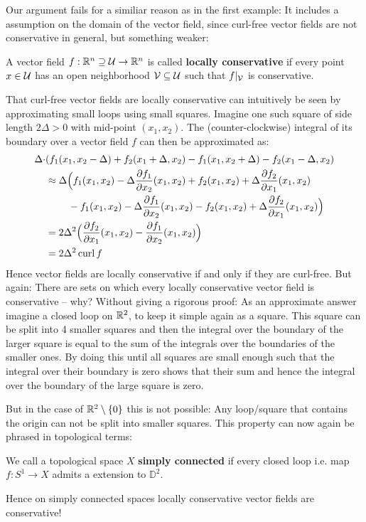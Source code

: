 Our argument fails for a similiar reason as in the first example: It includes a assumption on the domain of
the vector field, since curl-free vector fields are not conservative in general, but something weaker:
\begin{definition}
A vector field $f: \mathbb{R}^n \supseteq  \mathcal{U} \to \mathbb{R}^n$ is called \textbf{locally conservative} if every point $x \in \mathcal{U}$ has an
open neighborhood $\mathcal{V} \subseteq \mathcal{U}$ such that $f|_{\mathcal{V}}$ is conservative.
\end{definition}

That curl-free vector fields are locally conservative can intuitively be seen by approximating small loops using small squares.
Imagine one such square of side length $2\Delta > 0$ with mid-point $(x_1, x_2)$. The (counter-clockwise) integral of its boundary over
a vector field $f$ can then be approximated as:
\begin{align*}
	\Delta \cdot & (  f_1(x_1, x_2 - \Delta) + f_2(x_1 + \Delta, x_2) - f_1(x_1, x_2 + \Delta) - f_2(x_1 - \Delta, x_2) \\
	&\approx \Delta \Big( f_1(x_1, x_2) - \Delta \frac{\partial f_1}{\partial x_2}(x_1, x_2) + f_2(x_1, x_2) + \Delta \frac{\partial f_2}{\partial x_1}(x_1, x_2) \\
	       & \phantom{\approx \Delta (}		   - f_1(x_1, x_2) - \Delta \frac{\partial f_1}{\partial x_2} (x_1, x_2) - f_2(x_1, x_2) + \Delta \frac{\partial f_2}{\partial x_1}(x_1, x_2) \Big) \\
	      &= 2\Delta^2 \Big( \frac{\partial f_2}{\partial x_1}(x_1, x_2) - \frac{\partial f_1}{\partial x_2}(x_1, x_2)\Big) \\
	&= 2 \Delta^2 \operatorname{curl} f
\end{align*}
Hence vector fields are locally conservative if and only if they are curl-free. But again: There are sets on which
every locally conservative vector field is conservative – why? Without giving a rigorous proof:
As an approximate answer imagine a closed loop on $\mathbb{R}^2$, to keep it simple again as a square.
This square can be split into 4 smaller squares and then the integral over the boundary of the larger square is equal to the sum
of the integrals over the boundaries of the smaller ones. By doing this until all squares
are small enough such that the integral over their boundary is zero shows that their sum and hence the integral over the boundary of
the large square is zero.

But in the case of $\mathbb{R}^2 \setminus \{0\}$ this is not possible: Any loop/square that contains the origin can not be split into smaller squares.
This property can now again be phrased in topological terms:
\begin{definition}
We call a topological space $X$ \textbf{simply connected} if every closed loop i.e. map $f: S^1 \to X$ admits a extension to $\mathbb{D}^2$.
\end{definition}
Hence on simply connected spaces locally conservative vector fields are conservative!

